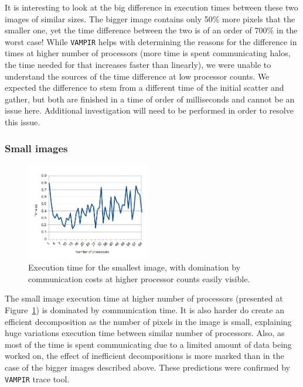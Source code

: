 \documentclass[11pt,a4paper]{article}
\begin{document}
It is interesting to look at the big difference in execution times between these two images of similar sizes.
The bigger image contains only 50\% more pixels that the smaller one, yet the time difference between the two is of an order of 700\% in the worst case!
While \texttt{VAMPIR} helps with determining the reasons for the difference in times at higher number of processors (more time is spent communicating halos, the time needed for that increases faster than linearly), we were unable to understand the sources of the time difference at low processor counts.
We expected the difference to stem from a different time of the initial scatter and gather, but both are finished in a time of order of milliseconds and cannot be an issue here.
Additional investigation will need to be performed in order to resolve this issue.

\subsubsection{Small images}
\begin{figure}
    \vspace{-60pt}
    \begin{center}
        \includegraphics[width=0.48\textwidth]{small_time.png}
    \end{center}
    \vspace{-30pt}
    \caption{Execution time for the smallest image, with domination by communication costs at higher processor counts easily visible.}\label{fig:small}
    \vspace{-30pt}
\end{figure}

The small image execution time at higher number of processors (presented at Figure~\ref{fig:small}) is dominated by communication time.
It is also harder do create an efficient decomposition as the number of pixels in the image is small, explaining huge variations execution time between similar number of processors.
Also, as most of the time is spent communicating due to a limited amount of data being worked on, the effect of inefficient decompositions is more marked than in the case of the bigger images described above.
These predictions were confirmed by \texttt{VAMPIR} trace tool.
\end{document}
